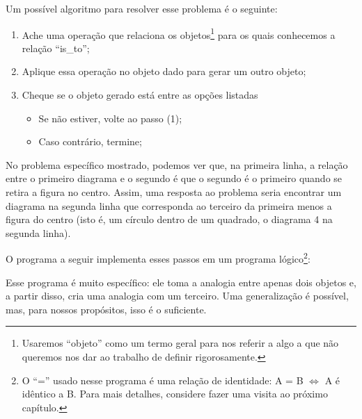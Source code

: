 \documentclass{article}
\theoremstyle{remark}
\theoremstyle{theorem}
\begin{document}
\vspace{1cm}Um possível algoritmo para resolver esse problema é o seguinte:

\begin{enumerate}
  \item Ache uma operação que relaciona os objetos\footnote{Usaremos ``objeto'' como um termo geral para nos referir a algo a que não queremos nos dar ao trabalho de definir rigorosamente.} para os quais conhecemos a relação ``is\_to'';
  \item Aplique essa operação no objeto dado para gerar um outro objeto;
  \item Cheque se o objeto gerado está entre as opções listadas
    \begin{itemize}
      \item Se não estiver, volte ao passo (1);
      \item Caso contrário, termine;
    \end{itemize}
\end{enumerate}

No problema específico mostrado, podemos ver que, na primeira linha, a relação entre o primeiro diagrama e o segundo é que o segundo é o primeiro quando se retira a figura no centro. Assim, uma resposta ao problema seria encontrar um diagrama na segunda linha que corresponda ao terceiro da primeira menos a figura do centro (isto é, um círculo dentro de um quadrado, o diagrama 4 na segunda linha).

O programa a seguir implementa esses passos em um programa lógico\footnote{O ``='' usado nesse programa é uma relação de identidade: A = B $\Leftrightarrow$ A é idêntico a B. Para mais detalhes, considere fazer uma visita ao próximo capítulo.}:



Esse programa é muito específico: ele toma a analogia entre apenas dois objetos e, a partir disso, cria uma analogia com um terceiro. Uma generalização é possível, mas, para nossos propósitos, isso é o suficiente.
\end{document}
